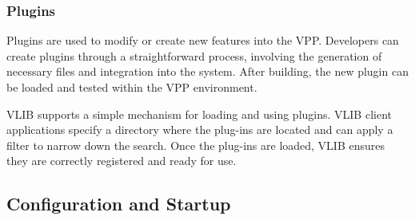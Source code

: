 \subsubsection{Plugins}
Plugins are used to modify or create new features into the VPP. 
Developers can create plugins through a straightforward process, involving the generation of necessary files and integration into the system. 
After building, the new plugin can be loaded and tested within the VPP environment. 

VLIB supports a simple mechanism for loading and using plugins. 
VLIB client applications specify a directory where the plug-ins are located and can apply a filter to narrow down the search. 
Once the plug-ins are loaded, VLIB ensures they are correctly registered and ready for use.


\subsection{Configuration and Startup}
